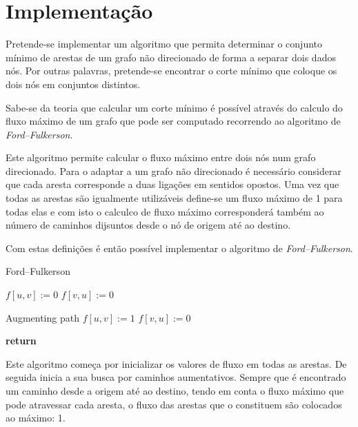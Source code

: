 \documentclass{article}
\begin{document}

\setcounter{page}{1}

\section{Implementação}

Pretende-se implementar um algoritmo que permita determinar o conjunto mínimo de arestas de um grafo não direcionado de forma a separar dois dados nós. Por outras palavras, pretende-se encontrar o corte mínimo que coloque os dois nós em conjuntos distintos.

Sabe-se da teoria que calcular um corte mínimo é possível através do calculo do fluxo máximo de um grafo que pode ser computado recorrendo ao algoritmo de \textit{Ford–Fulkerson}.

Este algoritmo permite calcular o fluxo máximo entre dois nós num grafo direcionado. Para o adaptar a um grafo não direcionado é necessário considerar que cada aresta corresponde a duas ligações em sentidos opostos. Uma vez que todas as arestas são igualmente utilizáveis define-se um fluxo máximo de 1 para todas elas e com isto o calculco de fluxo máximo corresponderá também ao número de caminhos dijsuntos desde o nó de origem até ao destino.

Com estas definições é então possível implementar o algoritmo de \textit{Ford–Fulkerson}.

\begin{algorithm}[H]
\caption{Ford–Fulkerson}
\label{al:Fordfulkerson}
\begin{algorithmic}[1]
		\State $f[u,v] := 0$
		\State $f[v,u] := 0$
	\EndFor
	
	\Comment Augmenting path
      \State $f[u,v] := 1$
	  	\State $f[v,u] := 0$
    \EndFor
	\EndWhile
	
	\State \textbf{return} 
\EndFunction
\end{algorithmic}
\end{algorithm}

Este algoritmo começa por inicializar os valores de fluxo em todas as arestas. De seguida inicia a sua busca por caminhos aumentativos. Sempre que é encontrado um caminho desde a origem até ao destino, tendo em conta o fluxo máximo que pode atravessar cada aresta, o fluxo das arestas que o constituem são colocados ao máximo: 1.
\end{document}
